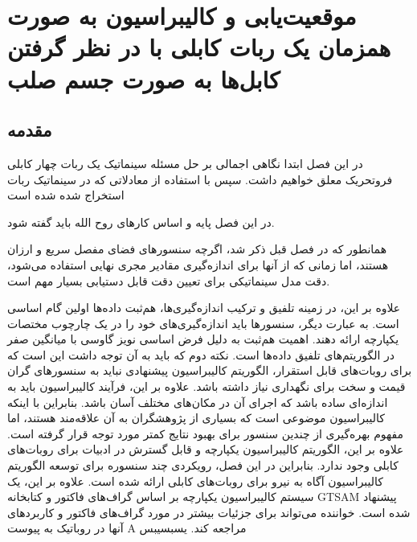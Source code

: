 \chapter{موقعیت‌یابی و کالیبراسیون به صورت همزمان یک ربات کابلی با در نظر گرفتن کابل‌ها به صورت جسم صلب}

\section{مقدمه}
در این فصل ابتدا نگاهی اجمالی بر حل مسئله سینماتیک یک ربات چهار کابلی فروتحریک معلق خواهیم داشت. سپس با استفاده از معادلاتی که در سینماتیک ربات استخراج شده شده است  

در این فصل پایه و اساس کارهای روح الله باید گفته شود.



همانطور که در فصل قبل ذکر شد، اگرچه سنسورهای فضای مفصل سریع و ارزان هستند، اما زمانی که از آنها برای اندازه‌گیری مقادیر مجری نهایی استفاده می‌شود، دقت مدل  سینماتیکی برای تعیین دقت قابل دستیابی بسیار مهم است. 


علاوه بر این، در زمینه تلفیق و ترکیب اندازه‌گیری‌ها، هم‌ثبت داده‌ها \cite{pott2013cable} اولین گام اساسی است. به عبارت دیگر، سنسورها باید اندازه‌گیری‌های خود را در یک چارچوب مختصات یکپارچه ارائه دهند. اهمیت هم‌ثبت به دلیل فرض اساسی نویز گاوسی با میانگین صفر در الگوریتم‌های تلفیق داده‌ها است. نکته دوم که باید به آن توجه داشت این است که برای روبات‌های قابل استقرار، الگوریتم کالیبراسیون پیشنهادی نباید به سنسورهای گران  قیمت و سخت برای نگهداری نیاز داشته باشد. علاوه بر این، فرآیند کالیبراسیون باید به اندازه‌ای ساده باشد که اجرای آن در مکان‌های مختلف آسان باشد. بنابراین با اینکه کالیبراسیون موضوعی است که بسیاری از پژوهشگران به آن علاقه‌مند هستند، اما مفهوم بهره‌گیری از چندین سنسور برای بهبود نتایج کمتر مورد توجه قرار گرفته است. علاوه بر این، الگوریتم کالیبراسیون یکپارچه و قابل گسترش در ادبیات برای روبات‌های کابلی وجود ندارد. بنابراین در این فصل، رویکردی چند سنسوره برای توسعه الگوریتم کالیبراسیون آگاه به نیرو برای روبات‌های کابلی ارائه شده است. علاوه بر این، یک سیستم کالیبراسیون یکپارچه بر اساس گراف‌های فاکتور و کتابخانه GTSAM پیشنهاد شده است. خواننده می‌تواند برای جزئیات بیشتر در مورد گراف‌های فاکتور و کاربردهای آنها در روباتیک به پیوست A مراجعه کند.
یسبسیبس

